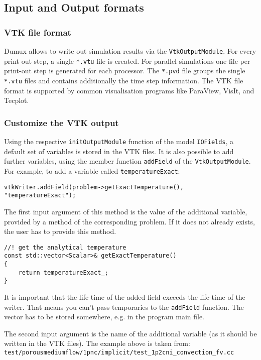 \subsection{Input and Output formats}

\subsubsection{VTK file format}
Dumux allows to write out simulation results via the \texttt{VtkOutputModule}.
For every print-out step, a single \texttt{*.vtu} file is created. For parallel simulations one file
per print-out step is generated for each processor.
The \texttt{*.pvd} file groups the single \texttt{*.vtu} files and contains additionally the time step information.
The VTK file format is supported by common visualisation programs like ParaView, VisIt, and Tecplot.

\subsubsection{Customize the VTK output}
Using the respective \texttt{initOutputModule} function of the model \texttt{IOFields}, a default
set of variables is stored in the VTK files. It is also possible to add further variables,
using the member function \texttt{addField} of the \texttt{VtkOutputModule}. For example, to add a variable called \texttt{temperatureExact}:
\begin{lstlisting}[style=DumuxCode]
vtkWriter.addField(problem->getExactTemperature(), "temperatureExact");
\end{lstlisting}

The first input argument of this method is the value of the additional variable, provided by a method of the corresponding problem.
If it does not already exists, the user has to provide this method.
\begin{lstlisting}[style=DumuxCode]
//! get the analytical temperature
const std::vector<Scalar>& getExactTemperature()
{
    return temperatureExact_;
}
\end{lstlisting}
It is important that the life-time of the added field exceeds the life-time of the writer. That means you can't pass temporaries
to the \texttt{addField} function. The vector has to be stored somewhere, e.g. in the program main file.

The second input argument is the name of the additional variable (as it should be written in the VTK files).
The example above is taken from: \\ \texttt{test/porousmediumflow/1pnc/implicit/test\_1p2cni\_convection\_fv.cc}

